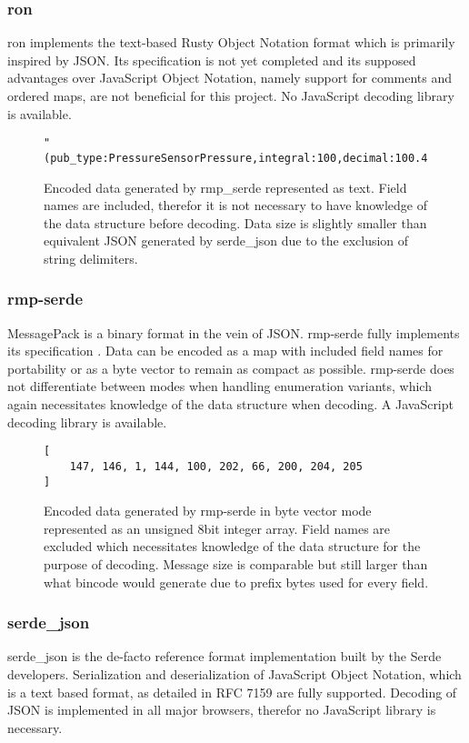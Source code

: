 \subsubsection{ron}
ron implements the text-based Rusty Object Notation format which is primarily inspired by JSON. Its specification \cite{ron-spec} is not yet completed and its supposed advantages over JavaScript Object Notation, namely support for comments and ordered maps, are not beneficial for this project. No JavaScript decoding library is available.
\begin{figure}[H]
\begin{verbatim}
"(pub_type:PressureSensorPressure,integral:100,decimal:100.4,)"
\end{verbatim}
\caption{Encoded data generated by rmp\_serde represented as text. Field names are included, therefor it is not necessary to have knowledge of the data structure before decoding. Data size is slightly smaller than equivalent JSON generated by serde\_json due to the exclusion of string delimiters.} 
\end{figure}

\subsubsection{rmp-serde}
MessagePack is a binary format in the vein of JSON. rmp-serde fully implements its specification \cite{rmp-serde-spec}. Data can be encoded as a map with included field names for portability or as a byte vector to remain as compact as possible. rmp-serde does not differentiate between modes when handling enumeration variants, which again necessitates knowledge of the data structure when decoding. A JavaScript decoding library is available.

\begin{figure}[H]
\begin{verbatim}
[
	147, 146, 1, 144, 100, 202, 66, 200, 204, 205
]
\end{verbatim}
\caption{Encoded data generated by rmp-serde in byte vector mode represented as an unsigned 8bit integer array. Field names are excluded which necessitates knowledge of the data structure for the purpose of decoding. Message size is comparable but still larger than what bincode would generate due to prefix bytes used for every field.} 
\end{figure}

\subsubsection{serde\_json}
serde\_json is the de-facto reference format implementation built by the Serde developers. Serialization and deserialization of JavaScript Object Notation, which is a text based format, as detailed in RFC 7159 \cite{json} are fully supported. Decoding of JSON is implemented in all major browsers, therefor no JavaScript library is necessary.

